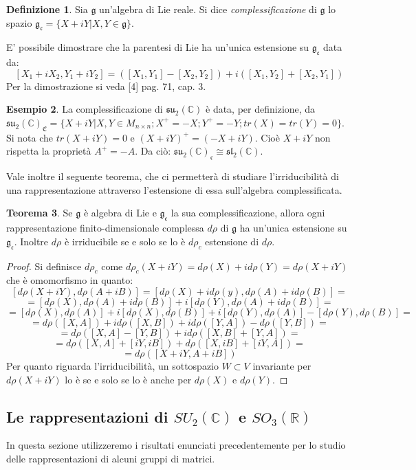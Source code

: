 \documentclass[12pt,a4paper]{report}
\theoremstyle{definition}
\newtheorem{Def}{Definizione}[chapter]
\newtheorem{Theo}[Def]{Teorema}
\theoremstyle{definition}
\newtheorem{Ex}[Def]{Esempio}
\theoremstyle{definition}
\theoremstyle{remark}
\begin{document}
\begin{Def}
	Sia $\mathfrak{g}$ un'algebra di Lie reale. Si dice \textit{complessificazione} di $\mathfrak{g}$ lo spazio $\mathfrak{g_c}=\{X+iY|X,Y\in\mathfrak{g}\}$.
\end{Def}
E' possibile dimostrare che la parentesi di Lie ha un'unica estensione su $\mathfrak{g_c}$ data da:
$$[X_1+iX_2,Y_1+iY_2]=([X_1,Y_1]-[X_2,Y_2])+i([X_1,Y_2]+[X_2,Y_1])$$
Per la dimostrazione si veda [4] pag. 71, cap. 3.\\
\begin{Ex}
La complessificazione di $\mathfrak{su_2(\mathbb{C})}$ è data, per definizione, da \\$\mathfrak{su_2(\mathbb{C})_C}=\{X+iY|X,Y\in M_{n\times n} ;X^{+}=-X;Y^{+}=-Y;tr(X)=tr(Y)=0\}$.\\
Si nota che $tr(X+iY)=0$ e $(X+iY)^+=(-X+iY)$. Cioè $X+iY$ non rispetta la proprietà $A^+=-A$. Da ciò: $\mathfrak{su_2(\mathbb{C})_c}\cong \mathfrak{sl_2(\mathbb{C})}$.
\end{Ex}
Vale inoltre il seguente teorema, che ci permetterà di studiare l'irriducibilità di una rappresentazione attraverso l'estensione di essa sull'algebra complessificata.
\begin{Theo}
	Se $\mathfrak{g}$ è algebra di Lie e $\mathfrak{g_c}$ la sua complessificazione, allora ogni rappresentazione finito-dimensionale complessa  $d\rho$ di $\mathfrak{g}$ ha un'unica estensione su $\mathfrak{g_c}$. Inoltre $d\rho$ è irriducibile se e solo se lo è $d\rho_c$ estensione di $d\rho$.
\end{Theo}
\begin{proof}
	Si definisce $d\rho_c$ come $d\rho_c(X+iY)=d\rho(X)+id\rho(Y)=d\rho(X+iY)$ che è omomorfismo in quanto: 
	$$[d\rho(X+iY),d\rho(A+iB)]=[d\rho(X)+id\rho(y),d\rho(A)+id\rho(B)]=$$$$=[d\rho(X),d\rho(A)+id\rho(B)]+i[d\rho(Y),d\rho(A)+id\rho(B)]=$$
	$$=[d\rho(X),d\rho(A)]+i[d\rho(X),d\rho(B)]+i[d\rho(Y),d\rho(A)]-[d\rho(Y),d\rho(B)]=$$
	$$=d\rho([X,A])+id\rho([X,B])+id\rho([Y,A])-d\rho([Y,B])=$$
	$$=d\rho([X,A]-[Y,B])+id\rho([X,B]+[Y,A])=$$
	$$=d\rho([X,A]+[iY,iB])+d\rho([X,iB]+[iY,A])=$$
	$$=d\rho([X+iY,A+iB])$$
	Per quanto riguarda l'irriducibilità, un sottospazio $W\subset V$ invariante per $d\rho(X+iY)$ lo è se e solo se lo è anche per $d\rho(X)$ e $d\rho(Y)$.
\end{proof}
\subsection{Le rappresentazioni di $SU_2(\mathbb{C})$ e $SO_3(\mathbb{R})$} 
In questa sezione utilizzeremo i risultati enunciati precedentemente per lo studio delle rappresentazioni di alcuni gruppi di matrici.\\
\end{document}
